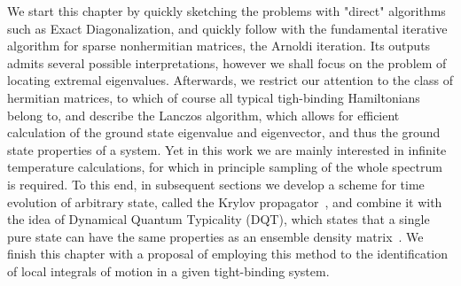 We start this chapter by quickly sketching the problems with "direct" algorithms such as Exact Diagonalization, and quickly
follow with the fundamental iterative algorithm for sparse nonhermitian matrices, the Arnoldi iteration. Its outputs admits several
possible interpretations, however we shall focus on the problem of locating extremal eigenvalues.
Afterwards, we restrict our attention to the class of hermitian matrices, to which of course all typical tigh-binding Hamiltonians
belong to, and describe the Lanczos algorithm, which allows for efficient calculation of the ground state eigenvalue and eigenvector,
and thus the ground state properties of a system.
Yet in this work we are mainly interested in infinite temperature calculations, for which in principle sampling of the whole
spectrum is required. To this end, in subsequent sections we develop a scheme for time evolution of arbitrary state,
called the Krylov propagator~\autocite{Park1986}, and combine it with the idea of Dynamical Quantum Typicality (DQT),
which states that a single pure state can have the same properties as an ensemble density matrix~\autocite{Gemmer2003,Goldstein2006,Popescu2006}.
We finish this chapter with a proposal of employing this method to the identification of local integrals of motion in a given
tight-binding system\autocite{Mierzejewski2015a}.

